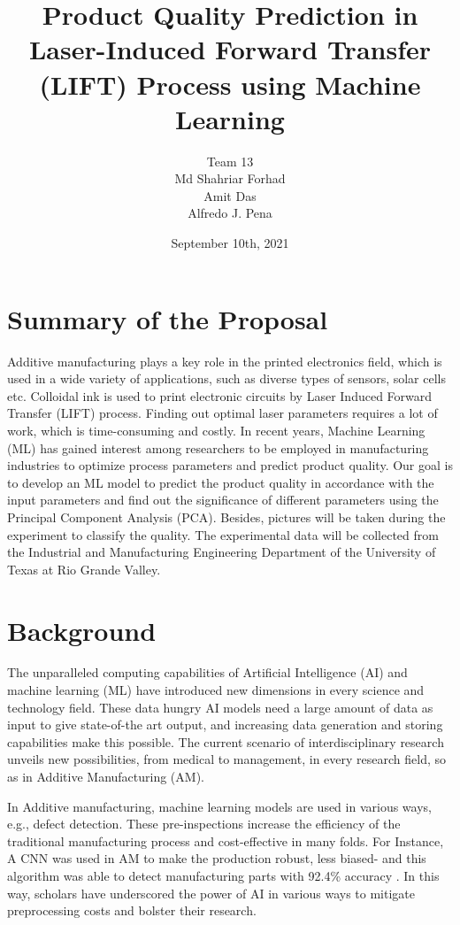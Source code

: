 \documentclass[letterpaper]{article}
\title{Product Quality Prediction in Laser-Induced Forward Transfer (LIFT) Process using Machine Learning}
\author{Team 13 \\ Md Shahriar Forhad\\Amit Das\\Alfredo J. Pena}
\date{September 10th, 2021}
\begin{document}
\maketitle

\section*{Summary of the Proposal}
Additive manufacturing plays a key role in the printed electronics field, which is used in a wide variety of applications, such as diverse types of sensors, solar cells etc. Colloidal ink is used to print electronic circuits by Laser Induced Forward Transfer (LIFT) process. Finding out optimal laser parameters requires a lot of work, which is time-consuming and costly. In recent years, Machine Learning (ML) has gained interest among researchers to be employed in manufacturing industries to optimize process parameters and predict product quality. Our goal is to develop an ML model to predict the product quality in accordance with the input parameters and find out the significance of different parameters using the Principal Component Analysis (PCA). Besides, pictures will be taken during the experiment to classify the quality. The experimental data will be collected from the Industrial and Manufacturing Engineering Department of the University of Texas at Rio Grande Valley.

\section*{Background}
The unparalleled computing capabilities of Artificial Intelligence (AI) and machine learning (ML) have introduced new dimensions in every science and technology field. These data hungry AI models need a large amount of data as input to give state-of-the art output, and increasing data generation and storing capabilities make this possible. The current scenario of interdisciplinary research unveils new possibilities, from medical to management, in every research field, so as in Additive Manufacturing (AM).\par
In Additive manufacturing, machine learning models are used in various ways, e.g., defect detection. These pre-inspections increase the efficiency of the traditional manufacturing process and cost-effective in many folds. For Instance, A CNN was used in AM to make the production robust, less biased- and this algorithm was able to detect manufacturing parts with 92.4\% accuracy \parencite[]{cui}. In this way, scholars have underscored the power of AI in various ways to mitigate preprocessing costs and bolster their research.
\end{document}
